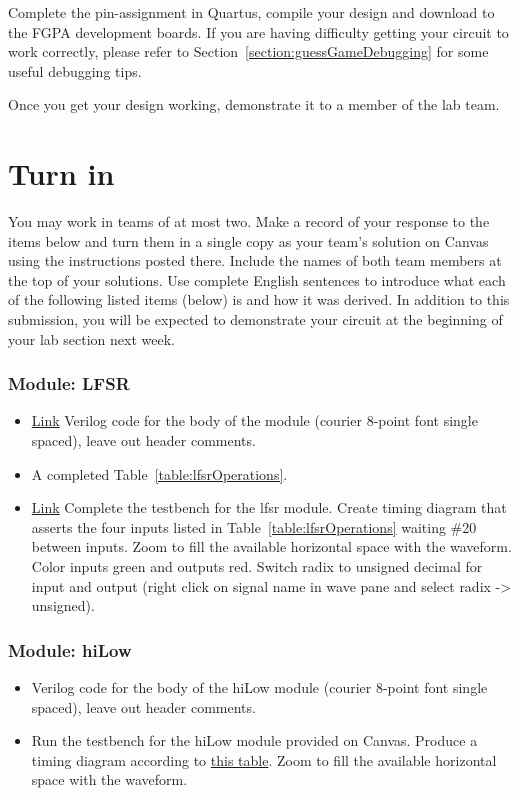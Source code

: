 Complete the pin-assignment in Quartus, compile your design and download to the
FGPA development boards.  If you are having difficulty getting your circuit to work
correctly, please refer to Section~\ref{section:guessGameDebugging} for some
useful debugging tips.

Once you get your design working, demonstrate it to a member of the
lab team.

\section{Turn in}

You may work in teams of at most two. Make a record of your response to
the items below and turn them in a single copy as your team's solution
on Canvas using the instructions posted there. Include the names of both
team members at the top of your solutions. Use complete English
sentences to introduce what each of the following listed items (below)
is and how it was derived. In addition to this submission, you will be
expected to demonstrate your circuit at the beginning of your lab
section next week.

\subsubsection{Module: LFSR }
\begin{itemize}
\item
\protect\hyperlink{lfsr_verilog}{Link} Verilog code for the body of
the module (courier 8-point font single spaced), leave out header
comments.
\item A completed Table~\ref{table:lfsrOperations}.
\item
\protect\hyperlink{lfsr_testbench}{Link} Complete the testbench for
the lfsr module. Create timing diagram that asserts the four inputs
listed in Table~\ref{table:lfsrOperations} waiting \#20 between inputs. Zoom to fill the
available horizontal space with the waveform. Color inputs green and
outputs red. Switch radix to unsigned decimal for input and output
(right click on signal name in wave pane and select radix
-\textgreater{} unsigned).
\end{itemize}

\subsubsection{Module: hiLow}

\begin{itemize}
\item
Verilog code for the body of the hiLow module (courier 8-point
font single spaced), leave out header comments.
\item
Run the testbench for the hiLow module provided on Canvas.
Produce a timing diagram according to
\hyperlink{hlgg:signalColor}{this table}. Zoom to
fill the available horizontal space with the waveform.
\end{itemize}

